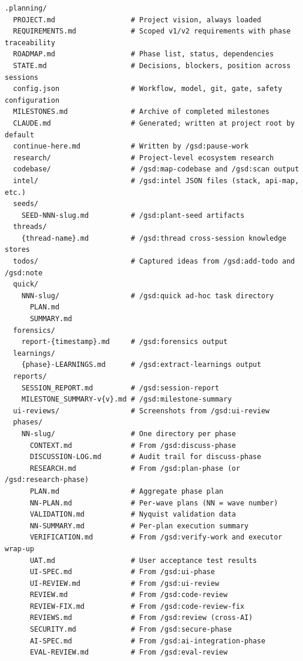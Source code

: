 \documentclass[10pt,letterpaper]{article}
\begin{document}
\begin{lstlisting}
.planning/
  PROJECT.md                  # Project vision, always loaded
  REQUIREMENTS.md             # Scoped v1/v2 requirements with phase traceability
  ROADMAP.md                  # Phase list, status, dependencies
  STATE.md                    # Decisions, blockers, position across sessions
  config.json                 # Workflow, model, git, gate, safety configuration
  MILESTONES.md               # Archive of completed milestones
  CLAUDE.md                   # Generated; written at project root by default
  continue-here.md            # Written by /gsd:pause-work
  research/                   # Project-level ecosystem research
  codebase/                   # /gsd:map-codebase and /gsd:scan output
  intel/                      # /gsd:intel JSON files (stack, api-map, etc.)
  seeds/
    SEED-NNN-slug.md          # /gsd:plant-seed artifacts
  threads/
    {thread-name}.md          # /gsd:thread cross-session knowledge stores
  todos/                      # Captured ideas from /gsd:add-todo and /gsd:note
  quick/
    NNN-slug/                 # /gsd:quick ad-hoc task directory
      PLAN.md
      SUMMARY.md
  forensics/
    report-{timestamp}.md     # /gsd:forensics output
  learnings/
    {phase}-LEARNINGS.md      # /gsd:extract-learnings output
  reports/
    SESSION_REPORT.md         # /gsd:session-report
    MILESTONE_SUMMARY-v{v}.md # /gsd:milestone-summary
  ui-reviews/                 # Screenshots from /gsd:ui-review
  phases/
    NN-slug/                  # One directory per phase
      CONTEXT.md              # From /gsd:discuss-phase
      DISCUSSION-LOG.md       # Audit trail for discuss-phase
      RESEARCH.md             # From /gsd:plan-phase (or /gsd:research-phase)
      PLAN.md                 # Aggregate phase plan
      NN-PLAN.md              # Per-wave plans (NN = wave number)
      VALIDATION.md           # Nyquist validation data
      NN-SUMMARY.md           # Per-plan execution summary
      VERIFICATION.md         # From /gsd:verify-work and executor wrap-up
      UAT.md                  # User acceptance test results
      UI-SPEC.md              # From /gsd:ui-phase
      UI-REVIEW.md            # From /gsd:ui-review
      REVIEW.md               # From /gsd:code-review
      REVIEW-FIX.md           # From /gsd:code-review-fix
      REVIEWS.md              # From /gsd:review (cross-AI)
      SECURITY.md             # From /gsd:secure-phase
      AI-SPEC.md              # From /gsd:ai-integration-phase
      EVAL-REVIEW.md          # From /gsd:eval-review
\end{lstlisting}
\end{document}
